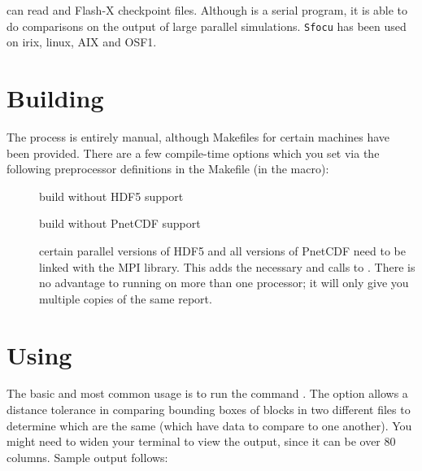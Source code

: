  can read  and 
Flash-X checkpoint files. Although  is a
serial program, it is able to do comparisons on the output of large
parallel simulations.  \texttt{Sfocu} has been used on irix, linux,
AIX and OSF1.

\section{Building }
\label{Sec:building sfocu}

The process is entirely manual, although Makefiles for certain machines have
been provided. There are a few compile-time options which you set via the
following preprocessor definitions in the Makefile (in the
 macro):

\begin{description}
\item[] build without HDF5 support
\item[] build without PnetCDF support
\item[] certain parallel versions of HDF5 and all versions of PnetCDF
need to be linked with the MPI library.  This adds the necessary
 and  calls to .
There is no advantage to running  on more than one
processor; it will only give you multiple copies of the same report.
\end{description}


\section{Using }
\label{Sec:using sfocu}

The basic and most common usage is to run the command . The option  allows a distance tolerance in comparing bounding boxes of blocks 
in two different files to determine which are the same (which have data to compare to one another).
You might need to widen your terminal to view the output,
since it can be over 80 columns. Sample output follows:

